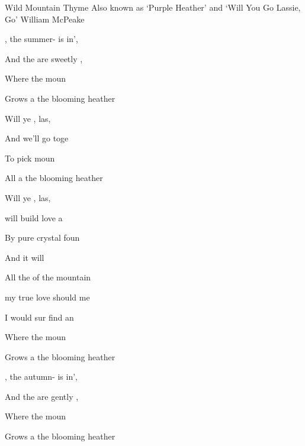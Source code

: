 \begin{SBSong}{Wild Mountain Thyme}
  {Also known as `Purple Heather' and `Will You Go Lassie, Go'}
  {William McPeake}
  \begin{SBVerse}
    , the summer- is in',
    
    And the  are sweetly ,
    
    Where the  moun 
    
    Grows a the blooming heather
  \end{SBVerse}
  \begin{SBChorus}
    Will ye , las, 

    And we'll  go toge 

    To pick  moun 

    All a the blooming heather

    Will ye , las, 
  \end{SBChorus}
  
  \begin{SBVerse}
     will build  love a 

    By  pure crystal foun

    And  it  will 

    All the  of the mountain
  \end{SBVerse}
  \begin{SBVerse}
     my true love  should  me

    I would sur find an

    Where the  moun 

    Grows a the blooming heather
  \end{SBVerse}
  \begin{SBVerse}
    , the autumn- is in',
    
    And the  are gently ,
    
    Where the  moun 

    Grows a the blooming heather
  \end{SBVerse}
\end{SBSong}
